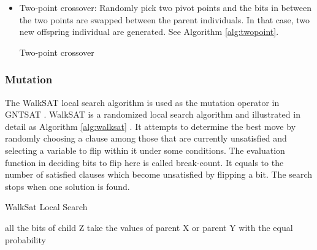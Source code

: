 \begin{itemize}
	\item
	      Two-point crossover: Randomly pick two pivot points and the bits in between
	      the two points are swapped between the parent individuals. In that case, two
	      new offspring individual are generated. See Algorithm \ref{alg:twopoint}.

	      \begin{algorithm}[t]
		      \SetAlgoLined
		      \caption{Two-point crossover}
		      \label{alg:twopoint}
		      \BlankLine
	      \end{algorithm}
\end{itemize}

\subsubsection{Mutation}
The WalkSAT local search algorithm is used as the mutation operator in GNTSAT
. WalkSAT is a randomized local search algorithm and illustrated in detail as
Algorithm \ref{alg:walksat} \parencite{biere2009handbook}. It attempts to
determine the best move by randomly choosing a clause among those that are
currently unsatisfied and selecting a variable to flip within it under some
conditions. The evaluation function in deciding bits to flip here is called
break-count. It equals to the number of satisfied clauses which become
unsatisfied by flipping a bit. The search stops when one solution is found.

\begin{algorithm*}[t]
	\SetAlgoLined
	\caption{WalkSat Local Search}
	\label{alg:walksat}
	\BlankLine
	all the bits of child Z take the values of parent X or parent Y with the equal
	probability\; 
\end{algorithm*}

